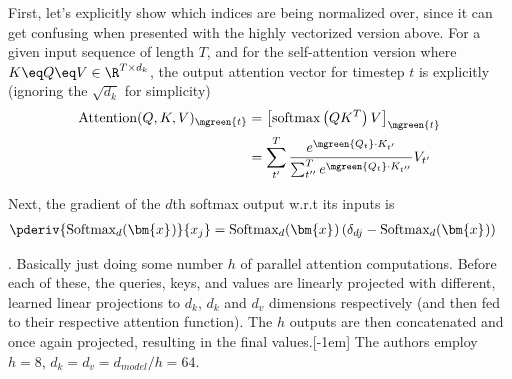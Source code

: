 \documentclass[11pt]{article}
\renewcommand\vec[2][]{\bm{#2}_{#1}}
\begin{document}
\begin{compactitem}
	First, let's explicitly show which indices are being normalized over, since it can get confusing when presented with the highly vectorized version above. For a given input sequence of length $T$, and for the self-attention version where $K \eq Q \eq V \in \R^{T \times d_{k}}$, the output attention vector for timestep $t$ is explicitly (ignoring the $\sqrt{d_k}$ for simplicity)
	\begin{align}
		\text{Attention}(Q, K, V)_{\mgreen{t}}
			&= \left[ \text{softmax}\left( Q K^T \right) V \right]_{\mgreen{t}} \\
			&= \sum_{t'}^{T} \dfrac{ e^{\mgreen{Q_t} \cdot K_{t'}}  }{  \sum_{t''}^{T} e^{\mgreen{Q_t} \cdot K_{t''}}    } V_{t'}
	\end{align} 

	Next, the gradient of the $d$th softmax output w.r.t its inputs is 
	\begin{align}
		\pderiv{ \text{Softmax}_d(\vec x) }{x_j} 
			&= \text{Softmax}_d(\vec x) \left(    \delta_{dj} - \text{Softmax}_d(\vec x)   \right)
	\end{align}
	
	
	
	\item {}. Basically just doing some number $h$ of parallel attention computations. Before each of these, the queries, keys, and values are linearly projected with different,
	learned linear projections to $d_k$, $d_k$ and $d_v$ dimensions respectively (and then fed to their respective attention function). The $h$ outputs are then concatenated and once again projected, resulting in the final values.
	The authors employ $h = 8$, $d_k = d_v = d_{model} / h = 64$. 
\end{compactitem}
\end{document}
